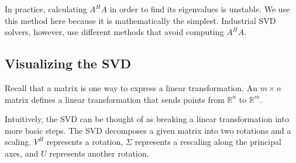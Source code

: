 \begin{info}
In practice, calculating $A^HA$ in order to find its eigenvalues is unstable.
We use this method here because it is mathematically the simplest.
Industrial SVD solvers, however, use different methods that avoid computing $A^HA$.
\end{info}

\subsection*{Visualizing the SVD}
Recall that a matrix is one way to express a linear transformation.
An $m\times n$ matrix defines a linear transformation that sends points from $\mathbb{R}^n$ to $\mathbb{R}^m$.

Intuitively, the SVD can be thought of as breaking a linear transformation into more basic steps.
The SVD decomposes a given matrix into two rotations and a scaling.
$V^H$ represents a rotation, $\Sigma$ represents a rescaling along the principal axes, and $U$ represents another rotation.


